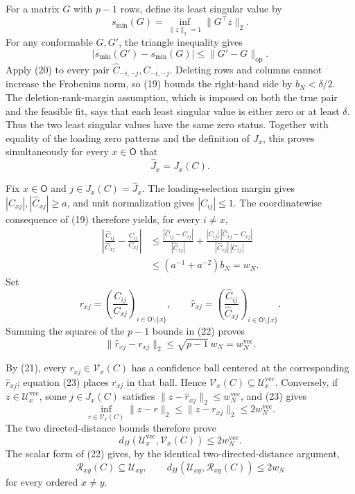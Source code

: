 For a matrix \(G\) with \(p-1\) rows, define its least singular value by
\[
 s_{\min}(G)=\inf_{\lVert z\rVert_2=1}\lVert G^\top z\rVert_2.
\]
For any conformable \(G,G'\), the triangle inequality gives
\[
 |s_{\min}(G')-s_{\min}(G)|
 \le\lVert G'-G\rVert_{\mathrm{op}}.
 \tag{20}
\]
Apply (20) to every pair \(\widehat C_{-i,-j},C_{-i,-j}\). Deleting rows and columns cannot increase the Frobenius norm, so (19) bounds the right-hand side by \(b_N<\delta/2\). The deletion-rank-margin assumption, which is imposed on both the true pair and the feasible fit, says that each least singular value is either zero or at least \(\delta\). Thus the two least singular values have the same zero status. Together with equality of the loading zero patterns and the definition of \(J_x\), this proves simultaneously for every \(x\in\mathsf O\) that
\[
 \widehat J_x=J_x(C).
 \tag{21}
\]

Fix \(x\in\mathsf O\) and \(j\in J_x(C)=\widehat J_x\). The loading-selection margin gives \(|C_{xj}|,|\widehat C_{xj}|\ge a\), and unit normalization gives \(|C_{ij}|\le1\). The coordinatewise consequence of (19) therefore yields, for every \(i\ne x\),
\[
 \begin{aligned}
 \left|\frac{\widehat C_{ij}}{\widehat C_{xj}}
 -\frac{C_{ij}}{C_{xj}}\right|
 &\le
 \frac{|\widehat C_{ij}-C_{ij}|}{|\widehat C_{xj}|}
 +\frac{|C_{ij}|\,|\widehat C_{xj}-C_{xj}|}
 {|\widehat C_{xj}|\,|C_{xj}|}\\
 &\le(a^{-1}+a^{-2})b_N=w_N.
 \end{aligned}
 \tag{22}
\]
Set
\[
 r_{xj}=\left(\frac{C_{ij}}{C_{xj}}\right)_{i\in\mathsf O\setminus\{x\}},
 \qquad
 \widehat r_{xj}=\left(
 \frac{\widehat C_{ij}}{\widehat C_{xj}}
 \right)_{i\in\mathsf O\setminus\{x\}}.
\]
Summing the squares of the \(p-1\) bounds in (22) proves
\[
 \lVert\widehat r_{xj}-r_{xj}\rVert_2
 \le\sqrt{p-1}\,w_N=w_N^{\mathrm{vec}}.
 \tag{23}
\]

By (21), every \(r_{xj}\in\mathcal V_x(C)\) has a confidence ball centered at the corresponding \(\widehat r_{xj}\); equation (23) places \(r_{xj}\) in that ball. Hence \(\mathcal V_x(C)\subseteq\mathcal U_x^{\mathrm{vec}}\). Conversely, if \(z\in\mathcal U_x^{\mathrm{vec}}\), some \(j\in J_x(C)\) satisfies \(\lVert z-\widehat r_{xj}\rVert_2\le w_N^{\mathrm{vec}}\), and (23) gives
\[
 \inf_{r\in\mathcal V_x(C)}\lVert z-r\rVert_2
 \le\lVert z-r_{xj}\rVert_2
 \le2w_N^{\mathrm{vec}}.
\]
The two directed-distance bounds therefore prove
\[
 d_H(\mathcal U_x^{\mathrm{vec}},\mathcal V_x(C))
 \le2w_N^{\mathrm{vec}}.
 \tag{24}
\]
The scalar form of (22) gives, by the identical two-directed-distance argument,
\[
 \mathcal R_{xy}(C)\subseteq\mathcal U_{xy},
 \qquad
 d_H(\mathcal U_{xy},\mathcal R_{xy}(C))\le2w_N
 \tag{25}
\]
for every ordered \(x\ne y\).

